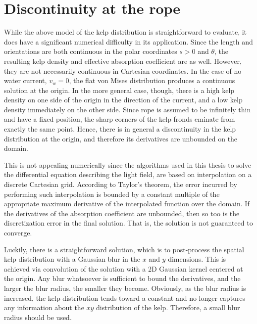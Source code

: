\section{Discontinuity at the rope}
While the above model of the kelp distribution is straightforward to evaluate, it does have a significant numerical difficulty in its application.
Since the length and orientations are both continuous in the polar coordinates $s>0$ and $\theta$, the resulting kelp density and effective absorption coefficient are as well.
However, they are not necessarily continuous in Cartesian coordinates.
In the case of no water current, $v_w=0$, the flat von Mises distribution produces a continuous solution at the origin.
In the more general case, though, there is a high kelp density on one side of the origin in the direction of the current, and a low kelp density immediately on the other side.
Since rope is assumed to be infinitely thin and have a fixed position, the sharp corners of the kelp fronds eminate from exactly the same point.
Hence, there is in general a discontinuity in the kelp distribution at the origin, and therefore its derivatives are unbounded on the domain.

This is not appealing numerically since the algorithms used in this thesis to solve the differential equation describing the light field, are based on interpolation on a discrete Cartesian grid.
According to Taylor's theorem, the error incurred by performing such interpolation is bounded by a constant multiple of the appropriate maximum derivative of the interpolated function over the domain.
If the derivatives of the absorption coefficient are unbounded, then so too is the discretization error in the final solution.
That is, the solution is not guaranteed to converge.

Luckily, there is a straightforward solution, which is to post-process the spatial kelp distribution with a Gaussian blur in the $x$ and $y$ dimensions.
This is achieved via convolution of the solution with a 2D Gaussian kernel centered at the origin.
Any blur whatsoever is sufficient to bound the derivatives, and the larger the blur radius, the smaller they become.
Obviously, as the blur radius is increased, the kelp distribution tends toward a constant and no longer captures any information about the $xy$ distribution of the kelp.
Therefore, a small blur radius should be used.

